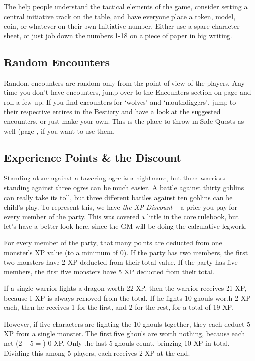 \begin{multicols}{2}
The help people understand the tactical elements of the game, consider setting a central initiative track on the table, and have everyone place a token, model, coin, or whatever on their own Initiative number.  Either use a spare character sheet, or just job down the numbers 1-18 on a piece of paper in big writing.

\subsection{Random Encounters}

Random encounters are random only from the point of view of the players.  Any time you don't have encounters, jump over to the Encounters section on page \pageref{encounters} and roll a few up.  If you find encounters for `wolves' and `mouthdiggers', jump to their respective entires in the Bestiary and have a look at the suggested encounters, or just make your own.  This is the place to throw in Side Quests as well (page \pageref{sidequests}, if you want to use them.

\subsection{Experience Points \& the Discount}

Standing alone against a towering ogre is a nightmare, but three warriors standing against three ogres can be much easier.  A battle against thirty goblins can really take its toll, but three different battles against ten goblins can be child's play.  To represent this, we have \textit{the XP Discount} -- a price you pay for every member of the party.  This was covered a little in the core rulebook, but let's have a better look here, since the GM will be doing the calculative legwork.

For every member of the party, that many points are deducted from one monster's XP value (to a minimum of 0).  If the party has two members, the first two monsters have 2 XP deducted from their total value.  If the party has five members, the first five monsters have 5 XP deducted from their total.

If a single warrior fights a dragon worth 22 XP, then the warrior receives 21 XP, because 1 XP is always removed from the total.  If he fights 10 ghouls worth 2 XP each, then he receives 1 for the first, and 2 for the rest, for a total of 19 XP.

However, if five characters are fighting the 10 ghouls together, they each deduct 5 XP from a single monster.
The first five ghouls are worth nothing, because each net ($2 - 5 = $) 0 XP.  Only the last 5 ghouls count, bringing 10 XP in total.  Dividing this among 5 players, each receives 2 XP at the end.


\end{multicols}
